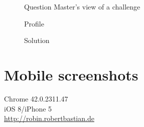 \documentclass{report}
\begin{document}
\begin{figure}
\caption{Question Master's view of a challenge}
\end{figure}

\begin{figure}
\caption{Profile}
\end{figure}

\begin{figure}
\caption{Solution}
\end{figure}

\chapter{Mobile screenshots}
Chrome 42.0.2311.47\\iOS 8/iPhone 5\\\url{http://robin.robertbastian.de}
\end{document}
